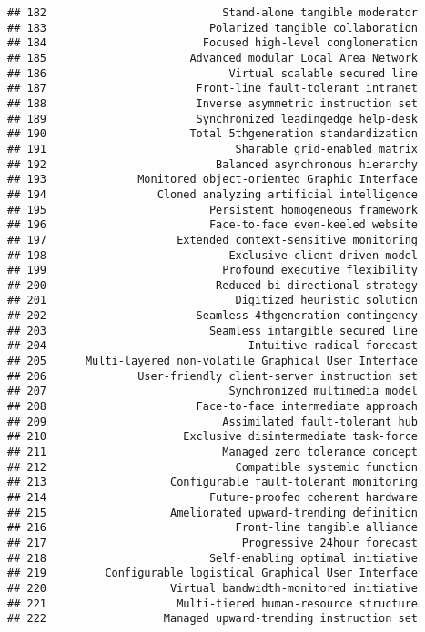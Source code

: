 \documentclass[
]{article}
\begin{document}
\begin{verbatim}
## 182                           Stand-alone tangible moderator
## 183                         Polarized tangible collaboration
## 184                        Focused high-level conglomeration
## 185                      Advanced modular Local Area Network
## 186                            Virtual scalable secured line
## 187                       Front-line fault-tolerant intranet
## 188                       Inverse asymmetric instruction set
## 189                       Synchronized leadingedge help-desk
## 190                      Total 5thgeneration standardization
## 191                             Sharable grid-enabled matrix
## 192                          Balanced asynchronous hierarchy
## 193              Monitored object-oriented Graphic Interface
## 194                 Cloned analyzing artificial intelligence
## 195                         Persistent homogeneous framework
## 196                         Face-to-face even-keeled website
## 197                    Extended context-sensitive monitoring
## 198                            Exclusive client-driven model
## 199                           Profound executive flexibility
## 200                          Reduced bi-directional strategy
## 201                             Digitized heuristic solution
## 202                       Seamless 4thgeneration contingency
## 203                         Seamless intangible secured line
## 204                               Intuitive radical forecast
## 205      Multi-layered non-volatile Graphical User Interface
## 206              User-friendly client-server instruction set
## 207                            Synchronized multimedia model
## 208                       Face-to-face intermediate approach
## 209                           Assimilated fault-tolerant hub
## 210                     Exclusive disintermediate task-force
## 211                           Managed zero tolerance concept
## 212                             Compatible systemic function
## 213                   Configurable fault-tolerant monitoring
## 214                         Future-proofed coherent hardware
## 215                   Ameliorated upward-trending definition
## 216                             Front-line tangible alliance
## 217                              Progressive 24hour forecast
## 218                         Self-enabling optimal initiative
## 219         Configurable logistical Graphical User Interface
## 220                   Virtual bandwidth-monitored initiative
## 221                    Multi-tiered human-resource structure
## 222                  Managed upward-trending instruction set

\end{verbatim}
\end{document}
